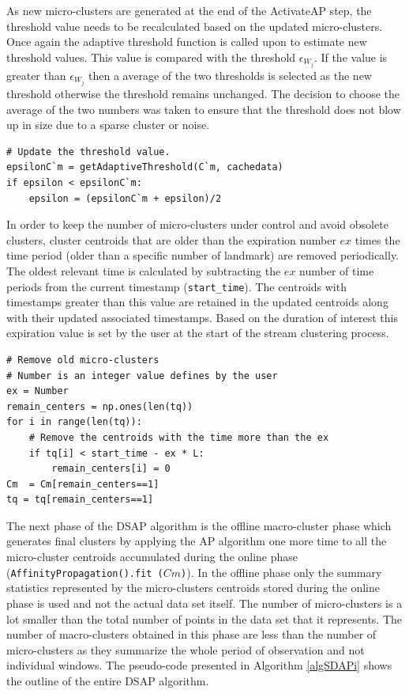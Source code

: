 As new micro-clusters are generated at the end of the ActivateAP step, the threshold value needs to be recalculated based on the updated micro-clusters. Once again the adaptive threshold function is called upon to estimate new threshold values. This value is compared with the threshold $\epsilon_{W_j}$. If the value is greater than $\epsilon_{W_j}$ then a average of the two thresholds is selected as the new threshold otherwise the threshold remains unchanged. The decision to choose the average of the two numbers was taken to ensure that the threshold does not blow up in size due to a sparse cluster or noise.
\begin{lstlisting}
# Update the threshold value.
epsilonC`m = getAdaptiveThreshold(C`m, cachedata)
if epsilon < epsilonC`m:
    epsilon = (epsilonC`m + epsilon)/2  
\end{lstlisting}

In order to keep the number of micro-clusters under control and avoid obsolete clusters, cluster centroids that are older than the expiration number $ex$ times the time period (older than a specific number of landmark) are removed periodically. The oldest relevant time is calculated by subtracting the $ex$ number of time periods from the current timestamp (\texttt{start\_time}). The centroids with timestamps greater than this value are retained in the updated centroids along with their updated associated timestamps. Based on the duration of interest this expiration value is set by the user at the start of the stream clustering process. 



\begin{lstlisting}
# Remove old micro-clusters
# Number is an integer value defines by the user
ex = Number
remain_centers = np.ones(len(tq))
for i in range(len(tq)):
    # Remove the centroids with the time more than the ex
    if tq[i] < start_time - ex * L:
        remain_centers[i] = 0
Cm  = Cm[remain_centers==1]
tq = tq[remain_centers==1]
\end{lstlisting}


The next phase of the DSAP algorithm is the offline macro-cluster phase which generates final clusters by applying the AP algorithm one more time to all the micro-cluster centroids accumulated during the online phase (\texttt{AffinityPropagation().fit ($Cm$)}). In the offline phase only the summary statistics represented by the micro-clusters centroids stored during the online phase is used and not the actual data set itself. The number of micro-clusters is a lot smaller than the total number of points in the data set that it represents. The number of macro-clusters obtained in this phase are less than the number of micro-clusters as they summarize the whole period of observation and not individual windows. The pseudo-code presented in Algorithm \ref{algSDAPi} shows the outline of the entire DSAP algorithm. 

